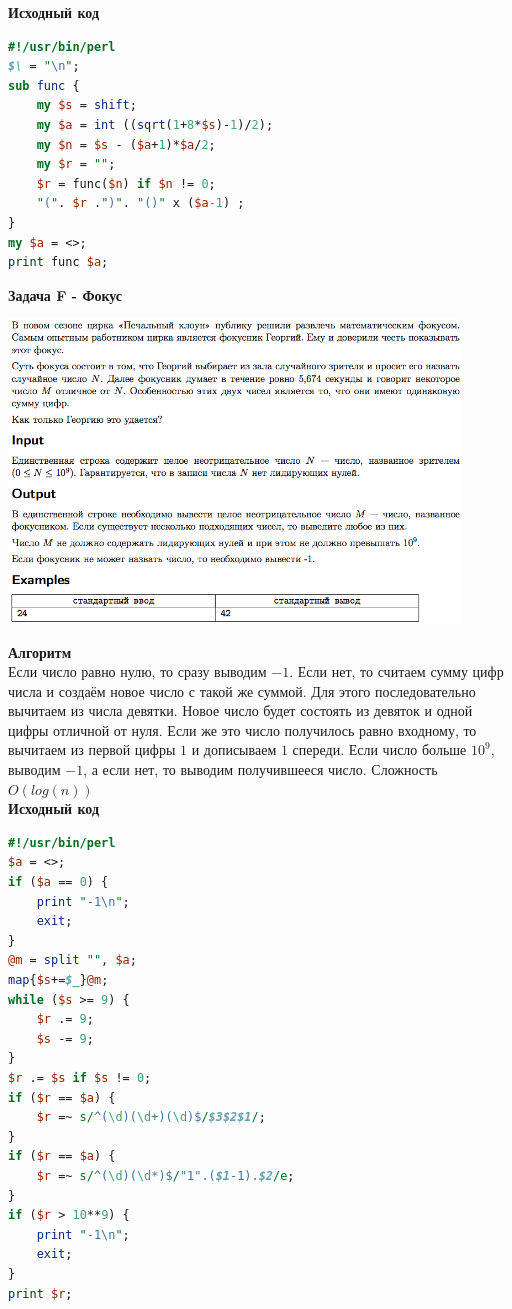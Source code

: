 \documentclass[a4paper,12pt]{article}
\begin{document}
\textbf{{\large Исходный код}}
\begin{lstlisting}[language=Perl]
#!/usr/bin/perl
$\ = "\n";
sub func {
	my $s = shift;
	my $a = int ((sqrt(1+8*$s)-1)/2);
	my $n = $s - ($a+1)*$a/2;
	my $r = "";
	$r = func($n) if $n != 0;
	"(". $r .")". "()" x ($a-1) ;
}
my $a = <>;
print func $a;
\end{lstlisting}
\newpage
\textbf{{\large Задача F - Фокус}} \\
\begin{center}
\includegraphics[width=0.9\textwidth]{OC_Ural/OC_Ural_F.png}\\ [1cm]
\end{center}
\newpage

\textbf{{\large Алгоритм}} \\
Если число равно нулю, то сразу выводим $-1$. Если нет, то считаем сумму цифр числа и создаём новое число с такой же суммой. Для этого последовательно вычитаем из числа девятки. Новое число будет состоять из девяток и одной цифры отличной от нуля. Если же это число получилось равно входному, то вычитаем из первой цифры $1$ и дописываем $1$ спереди. Если число больше $10^9$, выводим $-1$, а если нет, то выводим получившееся число.  Сложность $O(log(n))$\\ 

\textbf{{\large Исходный код}}
\begin{lstlisting}[language=Perl]
#!/usr/bin/perl
$a = <>;
if ($a == 0) {
	print "-1\n";
	exit;
}
@m = split "", $a;
map{$s+=$_}@m;
while ($s >= 9) {
	$r .= 9;
	$s -= 9;
}
$r .= $s if $s != 0;
if ($r == $a) {
	$r =~ s/^(\d)(\d+)(\d)$/$3$2$1/;
}
if ($r == $a) {
	$r =~ s/^(\d)(\d*)$/"1".($1-1).$2/e;
}
if ($r > 10**9) {
	print "-1\n";
	exit;
}
print $r;
\end{lstlisting}
\end{document}
